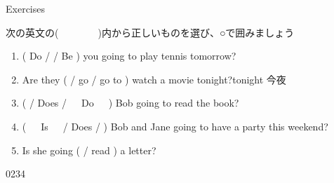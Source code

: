 \documentclass[aspectratio=169,xcolor={dvipsnames,table}]{beamer}
\newcommand{\myaudio}[1]{\href{#1}{\faVolumeUp}}
\begin{document}
\begin{frame}[plain]{Exercises}

{\small 次の英文の(~~~~~~~~)内から正しいものを選び、○で囲みましょう}

\begin{enumerate}
 \item ( Do /  / Be )  you going to play tennis tomorrow?
 \item Are they (  / go  / go to ) watch a movie tonight?\hfill{\scriptsize tonight  今夜}
 \item  (  / Does /~~~Do~~~) Bob going to read the book?
 \item (~~~Is~~~/ Does /   ) Bob and Jane going to have a party this weekend?
 \item  Is she going (  / read ) a letter?
\end{enumerate}
\hfill{\tiny 0234}\,{\scriptsize \myaudio{./audio/011_be_going_to_07.mp3}}
 \end{frame}
\end{document}
